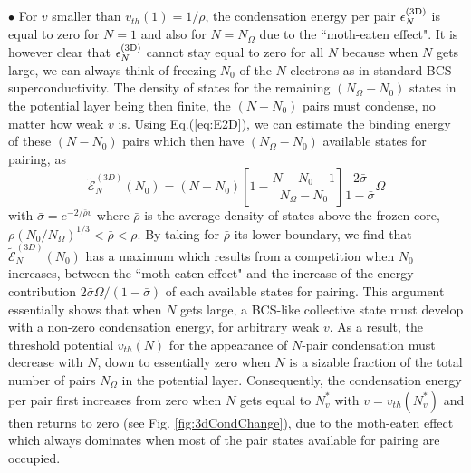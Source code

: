 \documentclass[5p,twocolumn]{elsarticle}
\begin{document}
$\bullet$ For $v$ smaller than $v_{th}(1)=1/\rho$, the condensation energy per pair $\epsilon_N^{{\text{(3D)}}}$ is equal to zero for $N=1$ and also for $N=N_\Omega$ due to the ``moth-eaten effect".  It is however clear that $\epsilon_N^{{\text{(3D)}}}$ cannot stay equal to zero for all $N$ because when $N$ gets large, we can always think of freezing $N_0$ of the $N$ electrons as in standard BCS superconductivity. The density of states for the remaining $(N_\Omega - N_0)$ states in the potential layer being then finite, the $(N-N_0)$ pairs must condense, no matter how weak $v$ is.  Using Eq.(\ref{eq:E2D}),
 we can estimate the binding energy of these $(N-N_0)$ pairs which then have $(N_\Omega - N_0)$ available states for pairing, as
\begin{equation}\label{eq:E3D}
\widetilde{\mathcal{E}}_N^{(3D)}(N_0)=(N-N_0)\left[1-\frac{N-N_0-1}{N_\Omega-N_0}\right]\frac{2\bar\sigma}{1-\bar\sigma}\Omega
\end{equation}
with $\bar{\sigma}=e^{-2/{\bar{\rho}v}}$ where $\bar\rho$ is the average density of states above the frozen core, $\rho(N_0/N_\Omega)^{ 1/3}<\bar\rho<\rho$. By taking for  $\bar\rho$ its lower boundary, we find that $\widetilde{\mathcal{E}}_N^{(3D)}(N_0)$ has a maximum which results from a competition when $N_0$ increases, between the ``moth-eaten effect" and the increase of the energy contribution $2\bar\sigma\Omega/(1-\bar\sigma)$ of each available states for pairing.
This argument essentially shows that when $N$ gets large, a BCS-like collective state must develop with a non-zero condensation energy, for arbitrary weak $v$. 
As a result, the threshold potential  $v_{th}(N)$ for the appearance of $N$-pair condensation  must decrease with $N$, down to essentially zero when $N$ is a sizable fraction of the total number of pairs $N_\Omega$ in the potential layer.  Consequently, the condensation energy per pair first increases from zero when $N$ gets equal to $N_v^*$ with $v=v_{th}(N_v^*)$ and then returns to zero (see Fig. \ref{fig:3dCondChange}), due to the moth-eaten effect which always dominates when most of the pair states available for pairing are occupied. 


\end{document}
